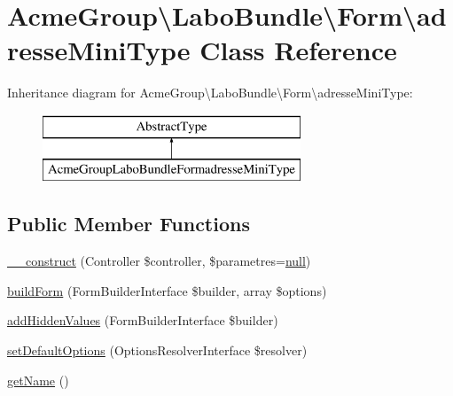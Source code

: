\hypertarget{class_acme_group_1_1_labo_bundle_1_1_form_1_1adresse_mini_type}{\section{Acme\+Group\textbackslash{}Labo\+Bundle\textbackslash{}Form\textbackslash{}adresse\+Mini\+Type Class Reference}
\label{class_acme_group_1_1_labo_bundle_1_1_form_1_1adresse_mini_type}
}
Inheritance diagram for Acme\+Group\textbackslash{}Labo\+Bundle\textbackslash{}Form\textbackslash{}adresse\+Mini\+Type\+:\begin{figure}[H]
\begin{center}
\leavevmode
\includegraphics[height=2.000000cm]{class_acme_group_1_1_labo_bundle_1_1_form_1_1adresse_mini_type}
\end{center}
\end{figure}
\subsection*{Public Member Functions}
\begin{DoxyCompactItemize}
\item 
\hyperlink{class_acme_group_1_1_labo_bundle_1_1_form_1_1adresse_mini_type_ac4480c9d3905cf096525a9d96d508d2c}{\+\_\+\+\_\+construct} (Controller \$controller, \$parametres=\hyperlink{validate_8js_afb8e110345c45e74478894341ab6b28e}{null})
\item 
\hyperlink{class_acme_group_1_1_labo_bundle_1_1_form_1_1adresse_mini_type_abe318f2ee0f46004da3152e0abff8827}{build\+Form} (Form\+Builder\+Interface \$builder, array \$options)
\item 
\hyperlink{class_acme_group_1_1_labo_bundle_1_1_form_1_1adresse_mini_type_a5136ef3dd930290b8252d594db11714c}{add\+Hidden\+Values} (Form\+Builder\+Interface \$builder)
\item 
\hyperlink{class_acme_group_1_1_labo_bundle_1_1_form_1_1adresse_mini_type_a4b468380caac646a3b6ba05217d0b4c4}{set\+Default\+Options} (Options\+Resolver\+Interface \$resolver)
\item 
\hyperlink{class_acme_group_1_1_labo_bundle_1_1_form_1_1adresse_mini_type_a61edc3422db622500971f9ea8c0d5248}{get\+Name} ()
\end{DoxyCompactItemize}


